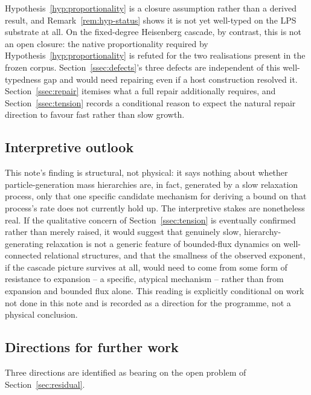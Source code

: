 \documentclass[11pt,a4paper]{article}
\theoremstyle{definition}
\theoremstyle{remark}
\begin{document}
    Hypothesis~\ref{hyp:proportionality} is a closure assumption rather than a derived
    result, and Remark~\ref{rem:hyp-status} shows it is not yet well-typed on the LPS
    substrate at all.
    On the fixed-degree Heisenberg cascade, by contrast, this is not an open closure: the
    native proportionality required by Hypothesis~\ref{hyp:proportionality} is refuted for
    the two realisations present in the frozen corpus.
    Section~\ref{ssec:defects}'s three defects are independent of this well-typedness gap and
    would need repairing even if a host construction resolved it.
    Section~\ref{ssec:repair} itemises what a full repair additionally requires, and
    Section~\ref{ssec:tension} records a conditional reason to expect the natural repair
    direction to favour fast rather than slow growth.

  \subsection{Interpretive outlook}
    \label{ssec:interpretive}

    This note's finding is structural, not physical: it says nothing about whether
    particle-generation mass hierarchies are, in fact, generated by a slow relaxation process,
    only that one specific candidate mechanism for deriving a bound on that process's rate
    does not currently hold up.
    The interpretive stakes are nonetheless real.
    If the qualitative concern of Section~\ref{ssec:tension} is eventually confirmed rather
    than merely raised, it would suggest that genuinely slow, hierarchy-generating relaxation
    is not a generic feature of bounded-flux dynamics on well-connected relational structures,
    and that the smallness of the observed exponent, if the cascade picture survives at all,
    would need to come from some form of resistance to expansion -- a specific, atypical
    mechanism -- rather than from expansion and bounded flux alone.
    This reading is explicitly conditional on work not done in this note and is recorded as a
    direction for the programme, not a physical conclusion.

  \subsection{Directions for further work}
    \label{ssec:directions}

    Three directions are identified as bearing on the open problem of
    Section~\ref{sec:residual}.
\end{document}
